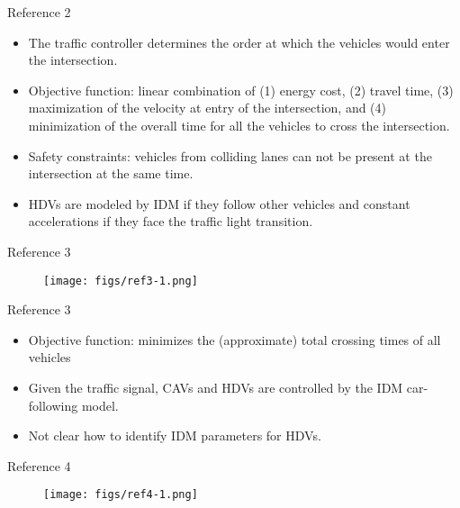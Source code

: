 \documentclass[9pt]{beamer}
\begin{document}
\begin{frame}{Reference 2}
\cite{ghosh2022traffic}

\begin{itemize}
\item The traffic controller determines the order at which the vehicles would enter the intersection.
\item Objective function: linear combination of (1) energy cost, (2) travel time, (3) maximization of the velocity at entry of the intersection, and (4) minimization of the overall time for all the vehicles to cross the intersection.
\item Safety constraints: vehicles from colliding lanes can not be present at the intersection at the same time.

\item HDVs are modeled by IDM if they follow other vehicles and constant accelerations if they face the traffic light transition. 

\end{itemize}

\end{frame}



\begin{frame}{Reference 3}
\cite{kamal2019development}
\begin{figure}
\texttt{[image: figs/ref3-1.png]}
\end{figure}
\end{frame}


\begin{frame}{Reference 3}

\cite{kamal2019development}
\begin{itemize}
\item Objective function: minimizes the (approximate) total crossing times of all vehicles
\item Given the traffic signal, CAVs and HDVs are controlled by the IDM car-following model.
\item Not clear how to identify IDM parameters for HDVs.
\end{itemize}
\end{frame}


\begin{frame}{Reference 4}
\cite{guo2023cotv}
\begin{figure}
\texttt{[image: figs/ref4-1.png]}
\end{figure}
\end{frame}
\end{document}
